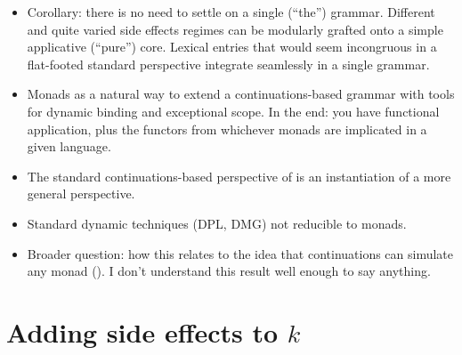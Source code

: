 \begin{itemize}
	\item Corollary: there is no need to settle on a single (``the'') grammar. Different and quite varied side effects regimes can be modularly grafted onto a simple applicative (``pure'') core. Lexical entries that would seem incongruous in a flat-footed standard perspective integrate seamlessly in a single grammar. %
	
	\item Monads as a natural way to extend a continuations-based grammar with tools for dynamic binding and exceptional scope. In the end: you have functional application, plus the functors from whichever monads are implicated in a given language. %
	
	\item The standard continuations-based perspective of \citealt{Barker:2002, ShanBarker:2006, BarkerShan:2014} is an instantiation of a more general perspective.%
	
	\item Standard dynamic techniques (DPL, DMG) not reducible to monads. 
	
	\item Broader question: how this relates to the idea that continuations can simulate any monad (\citealt{Filinski:1994}). I don't understand this result well enough to say anything. %
\end{itemize}

\section{Adding side effects to $k$}

